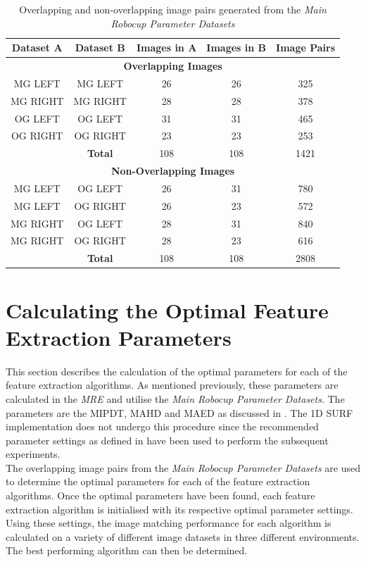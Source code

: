 \documentclass[11pt]{report}
\begin{document}
\begin{table}
\caption{Overlapping and non-overlapping image pairs generated from the \textit{Main Robocup Parameter Datasets} }
\begin{tabular}{|c|c|c|c|c|}
\hline 
\textbf{Dataset A} & \textbf{Dataset B} & \textbf{Images in A} & \textbf{Images in B} & \textbf{Image Pairs}\tabularnewline
\hline 
\hline 
\multicolumn{5}{|c}{\textbf{Overlapping Images}}\tabularnewline
\hline 
MG LEFT & MG LEFT & 26 & 26 & 325\tabularnewline
\hline 
MG RIGHT & MG RIGHT & 28 & 28 & 378\tabularnewline
\hline 
OG LEFT & OG LEFT & 31 & 31 & 465\tabularnewline
\hline 
OG RIGHT & OG RIGHT & 23 & 23 & 253\tabularnewline
\hline 
 & \textbf{Total} & 108 & 108 & 1421\tabularnewline
\hline 
\multicolumn{5}{|c}{\textbf{Non-Overlapping Images}}\tabularnewline
\hline 
MG LEFT & OG LEFT & 26 & 31 & 780\tabularnewline
\hline 
MG LEFT & OG RIGHT & 26 & 23 & 572\tabularnewline
\hline 
MG RIGHT & OG LEFT & 28 & 31 & 840\tabularnewline
\hline 
MG RIGHT & OG RIGHT & 28 & 23 & 616\tabularnewline
\hline 
 & \textbf{Total} & 108 & 108 & 2808\tabularnewline
\hline 
\end{tabular}
\label{tab:mrpd}
\end{table}

\section{Calculating the Optimal Feature Extraction Parameters}
\label{sec:optimalParameters}
This section describes the calculation of the optimal parameters for each of the feature extraction algorithms. As mentioned previously, these parameters are calculated in the \textit{MRE} and utilise the \textit{Main Robocup Parameter Datasets}. The parameters are the MIPDT, MAHD and MAED as discussed in . The 1D SURF implementation does not undergo this procedure since the recommended parameter settings as defined in \cite{Anderson} have been used to perform the subsequent experiments.\\

The overlapping image pairs from the \textit{Main Robocup Parameter Datasets} are used to determine the optimal parameters for each of the feature extraction algorithms. Once the optimal parameters have been found, each feature extraction algorithm is initialised with its respective optimal parameter settings. Using these settings, the image matching performance for each algorithm is calculated on a variety of different image datasets in three different environments. The best performing algorithm can then be determined.\\
\end{document}
